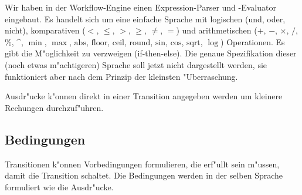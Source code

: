 \documentclass[a4paper,12pt]{article}
\newlength{\st}\setlength{\st}{0pt}
\newcommand{\expression}[1]{\texttt{#1}}
\begin{document}
Wir haben in der Workflow-Engine einen Expression-Parser und
-Evaluator eingebaut. Es handelt sich um eine einfache Sprache mit
logischen (und, oder, nicht), komparativen ($<$, $\le$, $>$, $\ge$,
$\ne$, $=$) und arithmetischen ($+$, $-$, $\times$, $/$, $\%$, \^{},
$\min$, $\max$, $\mbox{abs}$, $\mbox{floor}$, $\mbox{ceil}$,
$\mbox{round}$, $\mbox{sin}$, $\mbox{cos}$, $\mbox{sqrt}$, $\log$)
Operationen. Es gibt die M"oglichkeit zu verzweigen
(if-then-else). Die genaue Spezifikation dieser (noch etwas
m"achtigeren) Sprache soll jetzt nicht dargestellt werden, sie
funktioniert aber nach dem Prinzip der kleinsten "Uberraschung.

Ausdr"ucke k"onnen direkt in einer Transition angegeben werden um
kleinere Rechungen durchzuf"uhren.

\begin{center}
\end{center}

\subsection{Bedingungen}\label{sec:cond}

Transitionen k"onnen Vorbedingungen formulieren, die erf"ullt sein
m"ussen, damit die Transition schaltet. Die Bedingungen werden in der
selben Sprache formuliert wie die Ausdr"ucke.
\end{document}
